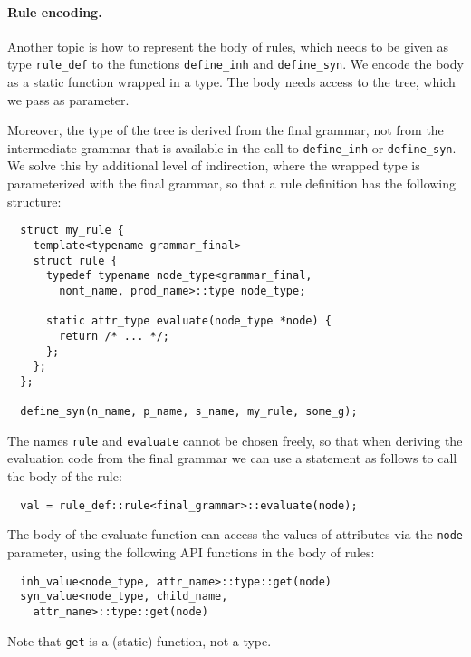 \documentclass{llncs}
\begin{document}
  \paragraph{Rule encoding.}
  Another topic is how to represent the body of rules, which
  needs to be given as type \lstinline$rule_def$ to the
  functions \lstinline$define_inh$ and \lstinline$define_syn$.
  We encode the body as a static function wrapped in a type.
  The body needs access to the tree, which we pass as parameter.

  Moreover, the type of the tree is derived from the final
  grammar, not from the intermediate grammar that is available
  in the call to \lstinline$define_inh$ or \lstinline$define_syn$.
  We solve this by additional level of indirection, where the
  wrapped type is parameterized with the final grammar, so that
  a rule definition has the following structure:
  \begin{lstlisting}
  struct my_rule {
    template<typename grammar_final>
    struct rule {
      typedef typename node_type<grammar_final,
        nont_name, prod_name>::type node_type;

      static attr_type evaluate(node_type *node) {
        return /* ... */;
      };
    };
  };

  define_syn(n_name, p_name, s_name, my_rule, some_g);
  \end{lstlisting}
  The names \lstinline$rule$ and \lstinline$evaluate$
  cannot be chosen freely, so that when deriving the
  evaluation code from the final grammar
  we can use a statement as follows to call the
  body of the rule:
  \begin{lstlisting}
  val = rule_def::rule<final_grammar>::evaluate(node);
  \end{lstlisting}

  The body of the evaluate function can access the
  values of attributes via the \lstinline$node$
  parameter, using the following API functions
  in the body of rules:
  \begin{lstlisting}
  inh_value<node_type, attr_name>::type::get(node)
  syn_value<node_type, child_name,
    attr_name>::type::get(node)
  \end{lstlisting}
  Note that \lstinline$get$ is a (static) function,
  not a type.
\end{document}
